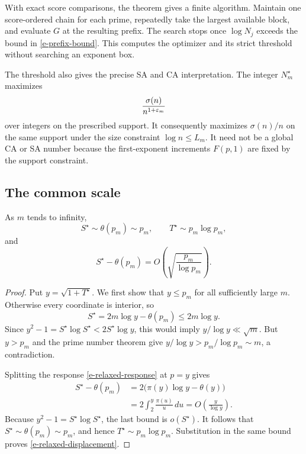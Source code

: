 With exact score comparisons, the theorem gives a finite algorithm.
Maintain one score-ordered chain for each prime, repeatedly take
the largest available block, and evaluate \(G\) at the resulting prefix.
The search stops once \(\log N_j\) exceeds the bound in
\eqref{e-prefix-bound}. This computes the optimizer and its strict
threshold without searching an exponent box.

The threshold also gives the precise SA and CA interpretation. The
integer \(N_m^\star\) maximizes
\[
    \frac{\sigma(n)}{n^{1+\varepsilon_m}}
\]
over integers on the prescribed support. It consequently maximizes
\(\sigma(n)/n\) on the same support under the size constraint
\(\log n\leq L_m\). It need not be a global CA or SA number because
the first-exponent increments \(F(p,1)\) are fixed by the support
constraint.

\subsection{The common scale}
\label{s-common-scale}

\begin{proposition}
\label{prop-relaxed-scale}
As \(m\) tends to infinity,
\[
    S^\star\sim\theta(p_m)\sim p_m,
    \qquad
    T^\star\sim p_m\log p_m,
\]
and
\begin{equation}
\label{e-relaxed-displacement}
    S^\star-\theta(p_m)
    =
    O\left(\sqrt{\frac{p_m}{\log p_m}}\right).
\end{equation}
\end{proposition}

\begin{proof}
Put \(y=\sqrt{1+T^\star}\). We first show that \(y\leq p_m\) for all
sufficiently large \(m\). Otherwise every coordinate is interior, so
\[
    S^\star
    =
    2m\log y-\theta(p_m)
    \leq2m\log y.
\]
Since \(y^2-1=S^\star\log S^\star<2S^\star\log y\), this would imply
\(y/\log y\ll\sqrt m\). But \(y>p_m\) and the prime number theorem give
\(y/\log y>p_m/\log p_m\sim m\), a contradiction.

Splitting the response \eqref{e-relaxed-response} at \(p=y\) gives
\[
\begin{aligned}
    S^\star-\theta(p_m)
    &=
    2\bigl(\pi(y)\log y-\theta(y)\bigr)\\
    &=
    2\int_2^y\frac{\pi(u)}u\,du
    =
    O\left(\frac{y}{\log y}\right).
\end{aligned}
\]
Because \(y^2-1=S^\star\log S^\star\), the last bound is \(o(S^\star)\).
It follows that \(S^\star\sim\theta(p_m)\sim p_m\), and hence
\(T^\star\sim p_m\log p_m\). Substitution in the same bound proves
\eqref{e-relaxed-displacement}.
\end{proof}

